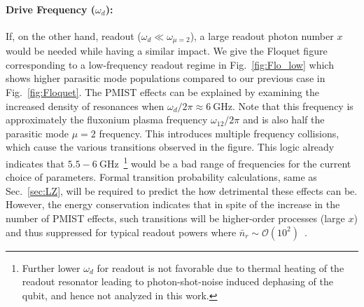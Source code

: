 \documentclass[%
reprint,
superscriptaddress,
 amsmath,amssymb,
 aps,
 prx,
longbibliography,
floatfix,
]{revtex4-2}
\begin{document}
\paragraph{Drive Frequency ($\omega_d$):} If, on the other hand, readout ($\omega_d \ll \omega_{\mu = 2}$), a large readout photon number $x$ would be needed while having a similar impact. We give the Floquet figure corresponding to a low-frequency readout regime in Fig.~\ref{fig:Flo_low} which shows higher parasitic mode populations compared to our previous case in Fig.~\ref{fig:Floquet}. The PMIST effects can be explained by examining the increased density of resonances when $\omega_d/2\pi \approx 6 \ \mathrm{GHz}$. Note that this frequency is approximately the fluxonium plasma frequency $\omega_{12}/2\pi$ and is also half the parasitic mode $\mu=2$ frequency. This introduces multiple frequency collisions, which cause the various transitions observed in the figure. This logic already indicates that $5.5-6 \ \mathrm{GHz}$~\footnote{Further lower $\omega_d$ for readout is not favorable due to thermal heating of the readout resonator leading to photon-shot-noise induced dephasing of the qubit, and hence not analyzed in this work. } would be a bad range of frequencies for the current choice of parameters. Formal transition probability calculations, same as Sec.~\ref{sec:LZ}, will be required to predict the how detrimental these effects can be. However, the energy conservation indicates that in spite of the increase in the number of PMIST effects, such transitions will be higher-order processes (large $x$) and thus suppressed for typical readout powers where $\bar n_r\sim \mathcal{O}(10^2)$~\cite{gusenkova2021quantum}.  
\end{document}
